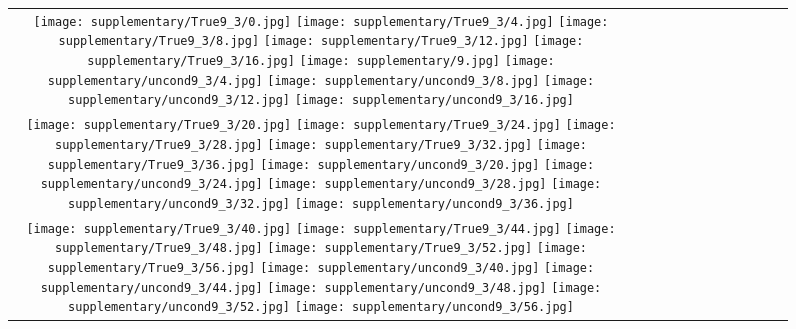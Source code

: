 \begin{figure*}[tb!]
    \centering
    \setlength{\tabcolsep}{0.5pt}
    {\small
    \renewcommand{\arraystretch}{0.5} 
    \begin{tabular}{c c c c c c c c c c c c }
    \captionsetup{type=figure, font=scriptsize}
  \texttt{[image: supplementary/True9\_3/0.jpg]}
  \texttt{[image: supplementary/True9\_3/4.jpg]}
  \texttt{[image: supplementary/True9\_3/8.jpg]}
  \texttt{[image: supplementary/True9\_3/12.jpg]}
  \texttt{[image: supplementary/True9\_3/16.jpg]}
  \hspace{5mm}
  \texttt{[image: supplementary/9.jpg]}
  \texttt{[image: supplementary/uncond9\_3/4.jpg]}
  \texttt{[image: supplementary/uncond9\_3/8.jpg]}
  \texttt{[image: supplementary/uncond9\_3/12.jpg]}
  \texttt{[image: supplementary/uncond9\_3/16.jpg]}

 \tabularnewline
  \texttt{[image: supplementary/True9\_3/20.jpg]}
  \texttt{[image: supplementary/True9\_3/24.jpg]}
  \texttt{[image: supplementary/True9\_3/28.jpg]}
  \texttt{[image: supplementary/True9\_3/32.jpg]}
  \texttt{[image: supplementary/True9\_3/36.jpg]}
  \hspace{5mm}
  \texttt{[image: supplementary/uncond9\_3/20.jpg]}
  \texttt{[image: supplementary/uncond9\_3/24.jpg]}
  \texttt{[image: supplementary/uncond9\_3/28.jpg]}
  \texttt{[image: supplementary/uncond9\_3/32.jpg]}
  \texttt{[image: supplementary/uncond9\_3/36.jpg]}

\tabularnewline
  \texttt{[image: supplementary/True9\_3/40.jpg]}
  \texttt{[image: supplementary/True9\_3/44.jpg]}
  \texttt{[image: supplementary/True9\_3/48.jpg]}
  \texttt{[image: supplementary/True9\_3/52.jpg]}
  \texttt{[image: supplementary/True9\_3/56.jpg]}
  \hspace{5mm}
  \texttt{[image: supplementary/uncond9\_3/40.jpg]}
  \texttt{[image: supplementary/uncond9\_3/44.jpg]}
  \texttt{[image: supplementary/uncond9\_3/48.jpg]}
  \texttt{[image: supplementary/uncond9\_3/52.jpg]}
  \texttt{[image: supplementary/uncond9\_3/56.jpg]}


\end{tabular}}
\end{figure*}
